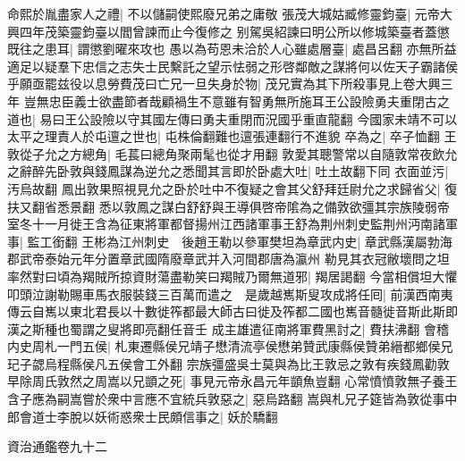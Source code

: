 命熙於胤盡家人之禮|{
	不以儲嗣使熙廢兄弟之庸敬}
張茂大城姑臧修靈鈞臺|{
	元帝大興四年茂築靈鈞臺以閻曾諫而止今復修之}
别駕吳紹諫曰明公所以修城築臺者蓋懲既往之患耳|{
	謂懲劉曜來攻也}
愚以為苟恩未洽於人心雖處層臺|{
	處昌呂翻}
亦無所益適足以疑羣下忠信之志失士民繫託之望示怯弱之形啓鄰敵之謀將何以佐天子霸諸侯乎願亟罷兹役以息勞費茂曰亡兄一旦失身於物|{
	茂兄實為其下所殺事見上卷大興三年}
豈無忠臣義士欲盡節者哉顧禍生不意雖有智勇無所施耳王公設險勇夫重閉古之道也|{
	易曰王公設險以守其國左傳曰勇夫重閉而況國乎重直龍翻}
今國家未靖不可以太平之理責人於屯邅之世也|{
	屯株倫翻難也邅張連翻行不進貌}
卒為之|{
	卒子恤翻}
王敦從子允之方總角|{
	毛萇曰總角聚兩髦也從才用翻}
敦愛其聰警常以自隨敦常夜飲允之辭醉先卧敦與錢鳳謀為逆允之悉聞其言即於卧處大吐|{
	吐土故翻下同}
衣面並污|{
	汚烏故翻}
鳳出敦果照視見允之卧於吐中不復疑之會其父舒拜廷尉允之求歸省父|{
	復扶又翻省悉景翻}
悉以敦鳳之謀白舒舒與王導俱啓帝隂為之備敦欲彊其宗族陵弱帝室冬十一月徙王含為征東將軍都督揚州江西諸軍事王舒為荆州刺史監荆州沔南諸軍事|{
	監工銜翻}
王彬為江州刺史　後趙王勒以參軍樊坦為章武内史|{
	章武縣漢屬勃海郡武帝泰始元年分置章武國隋廢章武并入河間郡唐為瀛州}
勒見其衣冠敝壞問之坦率然對曰頃為羯賊所掠資財蕩盡勒笑曰羯賊乃爾無道邪|{
	羯居謁翻}
今當相償坦大懼叩頭泣謝勒賜車馬衣服裝錢三百萬而遣之　是歲越嶲斯叟攻成將任囘|{
	前漢西南夷傳云自嶲以東北君長以十數徙筰都最大師古曰徙及筰都二國也嶲音髓徙音斯此斯即漢之斯種也蜀謂之叟將即亮翻任音壬}
成主雄遣征南將軍費黑討之|{
	費扶沸翻}
會稽内史周札一門五侯|{
	札東遷縣侯兄靖子懋清流亭侯懋弟贊武康縣侯贊弟縉都鄉侯兄玘子勰烏程縣侯凡五侯會工外翻}
宗族彊盛吳士莫與為比王敦忌之敦有疾錢鳳勸敦早除周氏敦然之周嵩以兄顗之死|{
	事見元帝永昌元年顗魚豈翻}
心常憤憤敦無子養王含子應為嗣嵩嘗於衆中言應不宜統兵敦惡之|{
	惡烏路翻}
嵩與札兄子筵皆為敦從事中郎會道士李脫以妖術惑衆士民頗信事之|{
	妖於驕翻}


資治通鑑卷九十二
